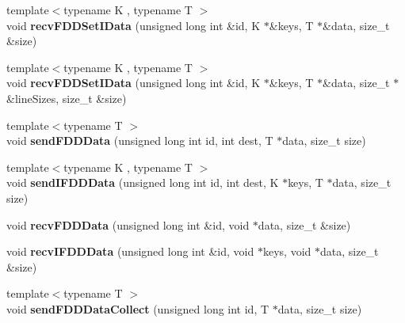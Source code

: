 \begin{DoxyCompactItemize}
\item 
\hypertarget{classfaster_1_1fastComm_ae234c6735666e85789aafc82120c0f0f}{}{\footnotesize template$<$typename K , typename T $>$ }\\void {\bfseries recv\+F\+D\+D\+Set\+I\+Data} (unsigned long int \&id, K $\ast$\&keys, T $\ast$\&data, size\+\_\+t \&size)\label{classfaster_1_1fastComm_ae234c6735666e85789aafc82120c0f0f}

\item 
\hypertarget{classfaster_1_1fastComm_a5f9da47ecd49c3456777bec1815c0600}{}{\footnotesize template$<$typename K , typename T $>$ }\\void {\bfseries recv\+F\+D\+D\+Set\+I\+Data} (unsigned long int \&id, K $\ast$\&keys, T $\ast$\&data, size\+\_\+t $\ast$\&line\+Sizes, size\+\_\+t \&size)\label{classfaster_1_1fastComm_a5f9da47ecd49c3456777bec1815c0600}

\item 
\hypertarget{classfaster_1_1fastComm_a0b67f926ff07626bec61c04fe3da36ef}{}{\footnotesize template$<$typename T $>$ }\\void {\bfseries send\+F\+D\+D\+Data} (unsigned long int id, int dest, T $\ast$data, size\+\_\+t size)\label{classfaster_1_1fastComm_a0b67f926ff07626bec61c04fe3da36ef}

\item 
\hypertarget{classfaster_1_1fastComm_aa26227cfe5edb65b68b9e0198ae69e94}{}{\footnotesize template$<$typename K , typename T $>$ }\\void {\bfseries send\+I\+F\+D\+D\+Data} (unsigned long int id, int dest, K $\ast$keys, T $\ast$data, size\+\_\+t size)\label{classfaster_1_1fastComm_aa26227cfe5edb65b68b9e0198ae69e94}

\item 
\hypertarget{classfaster_1_1fastComm_af880244a1924f6647f8c2d40a59853ef}{}void {\bfseries recv\+F\+D\+D\+Data} (unsigned long int \&id, void $\ast$data, size\+\_\+t \&size)\label{classfaster_1_1fastComm_af880244a1924f6647f8c2d40a59853ef}

\item 
\hypertarget{classfaster_1_1fastComm_a34a8ad79fda6a1146df90a13c14b95a3}{}void {\bfseries recv\+I\+F\+D\+D\+Data} (unsigned long int \&id, void $\ast$keys, void $\ast$data, size\+\_\+t \&size)\label{classfaster_1_1fastComm_a34a8ad79fda6a1146df90a13c14b95a3}

\item 
\hypertarget{classfaster_1_1fastComm_a708657fc9279d7a360a5f3102f91b36a}{}{\footnotesize template$<$typename T $>$ }\\void {\bfseries send\+F\+D\+D\+Data\+Collect} (unsigned long int id, T $\ast$data, size\+\_\+t size)\label{classfaster_1_1fastComm_a708657fc9279d7a360a5f3102f91b36a}


\end{DoxyCompactItemize}
